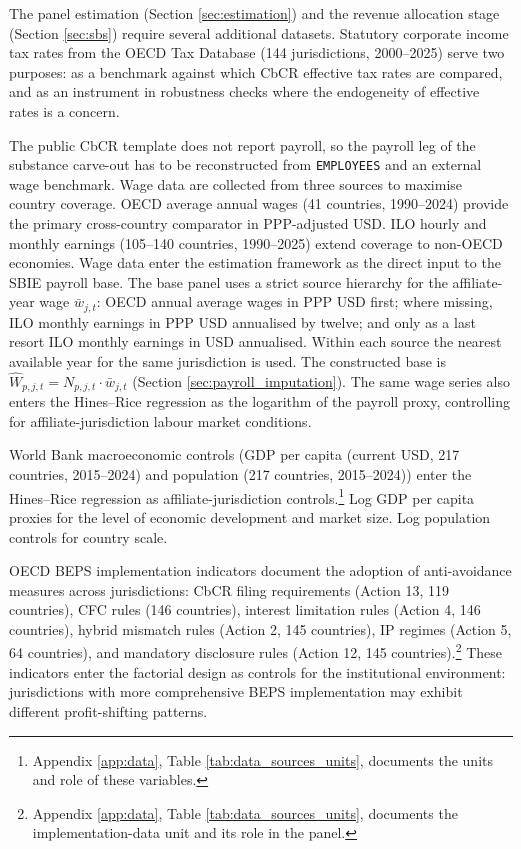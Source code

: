 \documentclass[11pt,a4paper]{article}
\newcommand{\code}[1]{\texttt{#1}}
\begin{document}
The panel estimation (Section \ref{sec:estimation}) and the revenue allocation stage (Section \ref{sec:sbs}) require several additional datasets. Statutory corporate income tax rates from the OECD Tax Database (144 jurisdictions, 2000--2025) serve two purposes: as a benchmark against which CbCR effective tax rates are compared, and as an instrument in robustness checks where the endogeneity of effective rates is a concern.

The public CbCR template does not report payroll, so the payroll leg of the substance carve-out has to be reconstructed from \code{EMPLOYEES} and an external wage benchmark. Wage data are collected from three sources to maximise country coverage. OECD average annual wages (41 countries, 1990--2024) provide the primary cross-country comparator in PPP-adjusted USD. ILO hourly and monthly earnings (105--140 countries, 1990--2025) extend coverage to non-OECD economies. Wage data enter the estimation framework as the direct input to the SBIE payroll base. The base panel uses a strict source hierarchy for the affiliate-year wage $\bar{w}_{j,t}$: OECD annual average wages in PPP USD first; where missing, ILO monthly earnings in PPP USD annualised by twelve; and only as a last resort ILO monthly earnings in USD annualised. Within each source the nearest available year for the same jurisdiction is used. The constructed base is $\hat{W}_{p,j,t} = N_{p,j,t} \cdot \bar{w}_{j,t}$ (Section \ref{sec:payroll_imputation}). The same wage series also enters the Hines--Rice regression as the logarithm of the payroll proxy, controlling for affiliate-jurisdiction labour market conditions.

World Bank macroeconomic controls (GDP per capita (current USD, 217 countries, 2015--2024) and population (217 countries, 2015--2024)) enter the Hines--Rice regression as affiliate-jurisdiction controls.\footnote{Appendix \ref{app:data}, Table \ref{tab:data_sources_units}, documents the units and role of these variables.} Log GDP per capita proxies for the level of economic development and market size. Log population controls for country scale.

OECD BEPS implementation indicators document the adoption of anti-avoidance measures across jurisdictions: CbCR filing requirements (Action 13, 119 countries), CFC rules (146 countries), interest limitation rules (Action 4, 146 countries), hybrid mismatch rules (Action 2, 145 countries), IP regimes (Action 5, 64 countries), and mandatory disclosure rules (Action 12, 145 countries).\footnote{Appendix \ref{app:data}, Table \ref{tab:data_sources_units}, documents the implementation-data unit and its role in the panel.} These indicators enter the factorial design as controls for the institutional environment: jurisdictions with more comprehensive BEPS implementation may exhibit different profit-shifting patterns.
\end{document}
